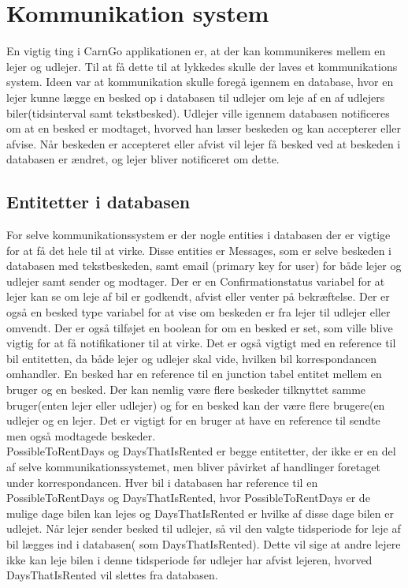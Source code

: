 \documentclass[SoftwareDesign/SoftwareDesign_main.tex]{subfiles}
\begin{document}
\section{Kommunikation system}
En vigtig ting i CarnGo applikationen er, at der kan kommunikeres mellem en lejer og udlejer. Til at få dette til at lykkedes skulle der laves et kommunikations system. Ideen var at kommunikation skulle foregå igennem en database, hvor en lejer kunne lægge en besked op i databasen til udlejer om leje af en af udlejers biler(tidsinterval samt tekstbesked). Udlejer ville igennem databasen notificeres om at en besked er modtaget, hvorved han læser beskeden og kan accepterer eller afvise. Når beskeden er accepteret eller afvist vil lejer få besked ved at beskeden i databasen er ændret, og lejer bliver notificeret om dette.

\subsection{Entitetter i databasen}
For selve kommunikationssystem er der nogle entities i databasen der er vigtige for at få det hele til at virke. Disse entities er Messages, som er selve beskeden i databasen med tekstbeskeden, samt email (primary key for user) for både lejer og udlejer samt sender og modtager. Der er en Confirmationstatus variabel for at lejer kan se om leje af bil er godkendt, afvist eller venter på bekræftelse. Der er også en besked type variabel for at vise om beskeden er fra lejer til udlejer eller omvendt. Der er også tilføjet en boolean for om en besked er set, som ville blive vigtig for at få notifikationer til at virke. Det er også vigtigt med en reference til bil entitetten, da både lejer og udlejer skal vide, hvilken bil korrespondancen omhandler. En besked har en reference til en junction tabel entitet mellem en bruger og en besked. Der kan nemlig være flere beskeder tilknyttet samme bruger(enten lejer eller udlejer) og for en besked kan der være flere brugere(en udlejer og en lejer. Det er vigtigt for en bruger at have en reference til sendte men også modtagede beskeder. 
\\
PossibleToRentDays og DaysThatIsRented er begge entitetter, der ikke er en del af selve kommunikationssystemet, men bliver påvirket af handlinger foretaget under korrespondancen. Hver bil i databasen har reference til en PossibleToRentDays og DaysThatIsRented, hvor PossibleToRentDays er de mulige dage bilen kan lejes og DaysThatIsRented er hvilke af disse dage bilen er udlejet. Når lejer sender besked til udlejer, så vil den valgte tidsperiode for leje af bil lægges ind i databasen( som DaysThatIsRented). Dette vil sige at andre lejere ikke kan leje bilen i denne tidsperiode før udlejer har afvist lejeren, hvorved DaysThatIsRented vil slettes fra databasen.
\end{document}
